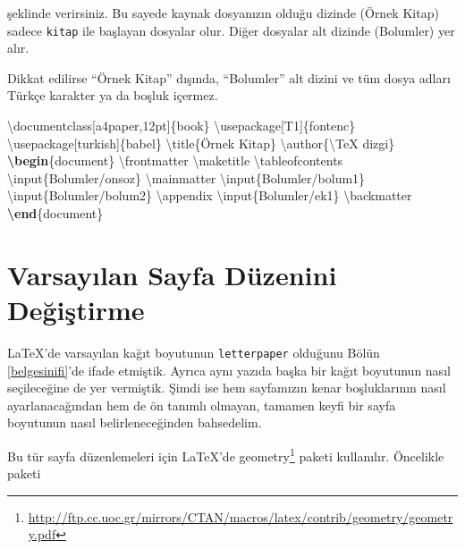 \documentclass[
  10pt,
]{scrbook}
\newenvironment{Shaded}{\begin{snugshade}}{\end{snugshade}}
\newcommand{\BuiltInTok}[1]{#1}
\newcommand{\ExtensionTok}[1]{#1}
\newcommand{\FunctionTok}[1]{\textcolor[rgb]{0.00,0.00,0.00}{#1}}
\newcommand{\KeywordTok}[1]{\textcolor[rgb]{0.13,0.29,0.53}{\textbf{#1}}}
\newcommand{\NormalTok}[1]{#1}
\renewcommand{\href}[2]{#2\footnote{\url{#1}}}
\theoremstyle{definition}
\theoremstyle{definition}
\theoremstyle{definition}
\theoremstyle{definition}
\theoremstyle{remark}
\begin{document}
şeklinde verirsiniz. Bu sayede kaynak dosyanızın olduğu dizinde (Örnek Kitap) sadece \texttt{kitap} ile başlayan dosyalar olur. Diğer dosyalar alt dizinde (Bolumler) yer alır.

Dikkat edilirse ``Örnek Kitap'' dışında, ``Bolumler'' alt dizini ve tüm dosya adları Türkçe karakter ya da boşluk içermez.

\begin{Shaded}
\begin{Highlighting}[]
\BuiltInTok{\textbackslash{}documentclass}\NormalTok{[a4paper,12pt]\{}\ExtensionTok{book}\NormalTok{\}}
\BuiltInTok{\textbackslash{}usepackage}\NormalTok{[T1]\{}\ExtensionTok{fontenc}\NormalTok{\}}
\BuiltInTok{\textbackslash{}usepackage}\NormalTok{[turkish]\{}\ExtensionTok{babel}\NormalTok{\}}
\FunctionTok{\textbackslash{}title}\NormalTok{\{Örnek Kitap\}}
\FunctionTok{\textbackslash{}author}\NormalTok{\{}\FunctionTok{\textbackslash{}TeX}\NormalTok{ dizgi\}}
\KeywordTok{\textbackslash{}begin}\NormalTok{\{}\ExtensionTok{document}\NormalTok{\}}
\FunctionTok{\textbackslash{}frontmatter}
\FunctionTok{\textbackslash{}maketitle}
\FunctionTok{\textbackslash{}tableofcontents}
\FunctionTok{\textbackslash{}input}\NormalTok{\{Bolumler/onsoz\}}
\FunctionTok{\textbackslash{}mainmatter}
\FunctionTok{\textbackslash{}input}\NormalTok{\{Bolumler/bolum1\}}
\FunctionTok{\textbackslash{}input}\NormalTok{\{Bolumler/bolum2\}}
\FunctionTok{\textbackslash{}appendix}
\FunctionTok{\textbackslash{}input}\NormalTok{\{Bolumler/ek1\}}
\FunctionTok{\textbackslash{}backmatter}
\KeywordTok{\textbackslash{}end}\NormalTok{\{}\ExtensionTok{document}\NormalTok{\}}
\end{Highlighting}
\end{Shaded}

\hypertarget{varsayux131lan-sayfa-duxfczenini-deux11fiux15ftirme}{%
\section{Varsayılan Sayfa Düzenini Değiştirme}\label{varsayux131lan-sayfa-duxfczenini-deux11fiux15ftirme}}

LaTeX'de varsayılan kağıt boyutunun \texttt{letterpaper} olduğunu Bölün \ref{belgesinifi}'de ifade etmiştik. Ayrıca aynı yazıda başka bir kağıt boyutunun nasıl seçileceğine de yer vermiştik. Şimdi ise hem sayfamızın kenar boşluklarının nasıl ayarlanacağından hem de ön tanımlı olmayan, tamamen keyfi bir sayfa boyutunun nasıl belirleneceğinden bahsedelim.

Bu tür sayfa düzenlemeleri için LaTeX'de \href{http://ftp.cc.uoc.gr/mirrors/CTAN/macros/latex/contrib/geometry/geometry.pdf}{geometry} paketi kullanılır. Öncelikle paketi
\end{document}
